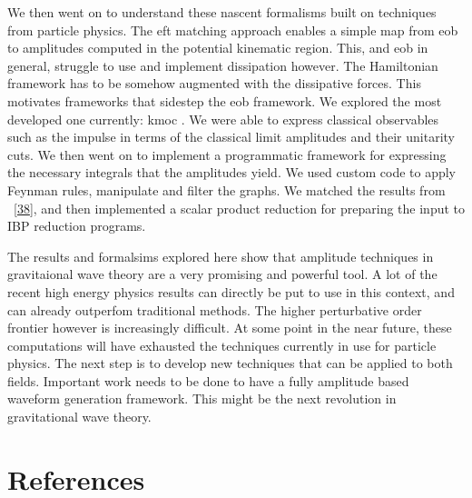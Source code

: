 \documentclass[
  10pt,
  a4paper,
  DIV=11,
  numbers=noendperiod,
  oneside]{scrreprt}
\DeclareRobustCommand{\[}{\begin{equation}}
\DeclareRobustCommand{\]}{\end{equation}}
\begin{document}
We then went on to understand these nascent formalisms built on
techniques from particle physics. The \gls{eft} matching approach
enables a simple map from \gls{eob} to amplitudes computed in the
potential kinematic region. This, and \gls{eob} in general, struggle to
use and implement dissipation however. The Hamiltonian framework has to
be somehow augmented with the dissipative forces. This motivates
frameworks that sidestep the \gls{eob} framework. We explored the most
developed one currently: \gls{kmoc} . We were able to express classical
observables such as the impulse in terms of the classical limit
amplitudes and their unitarity cuts. We then went on to implement a
programmatic framework for expressing the necessary integrals that the
amplitudes yield. We used custom code to apply Feynman rules, manipulate
and filter the graphs. We matched the results from
~{[}\protect\hyperlink{ref-Kosower:2018adc}{38}{]}, and then implemented
a scalar product reduction for preparing the input to IBP reduction
programs.

The results and formalsims explored here show that amplitude techniques
in gravitaional wave theory are a very promising and powerful tool. A
lot of the recent high energy physics results can directly be put to use
in this context, and can already outperfom traditional methods. The
higher perturbative order frontier however is increasingly difficult. At
some point in the near future, these computations will have exhausted
the techniques currently in use for particle physics. The next step is
to develop new techniques that can be applied to both fields. Important
work needs to be done to have a fully amplitude based waveform
generation framework. This might be the next revolution in gravitational
wave theory.


\hypertarget{references}{%
\chapter*{References}\label{references}}

\end{document}
